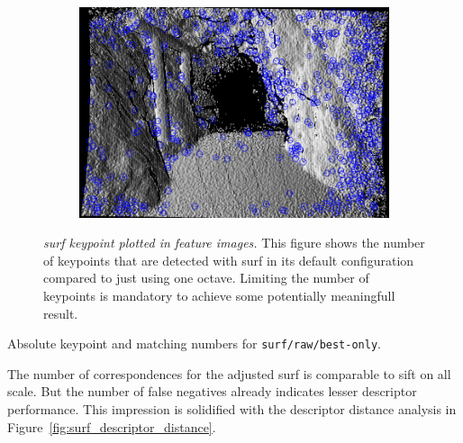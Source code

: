 \begin{figure}[H]
\begin{subfigure}[t]{0.25\linewidth}
\end{subfigure}%
\begin{subfigure}[t]{0.25\linewidth}
    \includegraphics[width=\linewidth]{chapter06/results/SURF/bearing/oneoctave_kp0005.png}%
\end{subfigure}%
\caption[\acrshort{surf} keypoint plotted in feature images]{\emph{\acrshort{surf} keypoint plotted in feature images.} This figure shows the number of keypoints that are detected with \acrshort{surf} in its default configuration compared to just using one octave. Limiting the number of keypoints is mandatory to achieve some potentially meaningfull result.}\label{fig:surf_keypoints_mess}
\end{figure}
\begin{table}[H]
    {\renewcommand{\arraystretch}{1.2}%
    \setlength{\tabcolsep}{0.3em}%

    }
    \caption{Absolute keypoint and matching numbers for \texttt{\acrshort{surf}/raw/best-only}.}\label{tab:surf_results}
\end{table}
The number of correspondences for the adjusted \acrshort{surf} is comparable to \acrshort{sift} on all scale.
But the number of false negatives already indicates lesser descriptor performance.
This impression is solidified with the descriptor distance analysis in Figure~\ref{fig:surf_descriptor_distance}.
